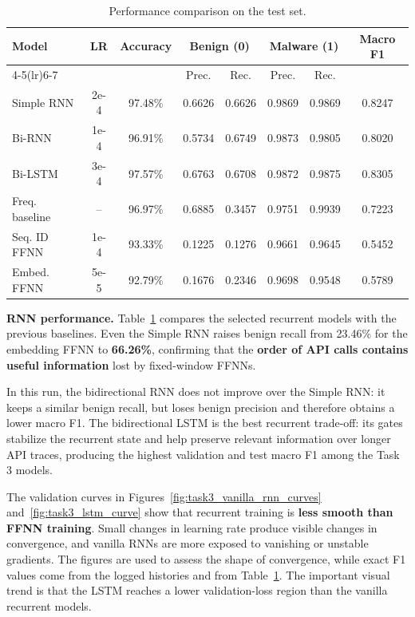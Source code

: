 \begin{table}[H]
\footnotesize
\centering
\setlength{\tabcolsep}{4pt}
\renewcommand{\arraystretch}{0.9}
\caption{Performance comparison on the test set.}
\label{tab:task3_performance}
\begin{tabular}{lccccccc}
\toprule
\textbf{Model} & \textbf{LR} & \textbf{Accuracy} & \multicolumn{2}{c}{\textbf{Benign (0)}} & \multicolumn{2}{c}{\textbf{Malware (1)}} & \textbf{Macro F1} \\
\cmidrule(lr){4-5}\cmidrule(lr){6-7}
 & & & Prec. & Rec. & Prec. & Rec. & \\
\midrule
Simple RNN & 2e-4 & 97.48\% & 0.6626 & 0.6626 & 0.9869 & 0.9869 & 0.8247 \\
Bi-RNN & 1e-4 & 96.91\% & 0.5734 & 0.6749 & 0.9873 & 0.9805 & 0.8020 \\
Bi-LSTM & 3e-4 & 97.57\% & 0.6763 & 0.6708 & 0.9872 & 0.9875 & 0.8305 \\
\midrule
Freq. baseline & -- & 96.97\% & 0.6885 & 0.3457 & 0.9751 & 0.9939 & 0.7223 \\
Seq. ID FFNN & 1e-4 & 93.33\% & 0.1225 & 0.1276 & 0.9661 & 0.9645 & 0.5452 \\
Embed. FFNN & 5e-5 & 92.79\% & 0.1676 & 0.2346 & 0.9698 & 0.9548 & 0.5789 \\
\bottomrule
\end{tabular}
\end{table}

\textbf{RNN performance.} Table~\ref{tab:task3_performance} compares the selected recurrent models with the previous baselines. Even the Simple RNN raises benign recall from 23.46\% for the embedding FFNN to \textbf{66.26\%}, confirming that the \textbf{order of API calls contains useful information} lost by fixed-window FFNNs.

In this run, the bidirectional RNN does not improve over the Simple RNN: it keeps a similar benign recall, but loses benign precision and therefore obtains a lower macro F1. The bidirectional LSTM is the best recurrent trade-off: its gates stabilize the recurrent state and help preserve relevant information over longer API traces, producing the highest validation and test macro F1 among the Task 3 models.

The validation curves in Figures~\ref{fig:task3_vanilla_rnn_curves} and~\ref{fig:task3_lstm_curve} show that recurrent training is \textbf{less smooth than FFNN training}. Small changes in learning rate produce visible changes in convergence, and vanilla RNNs are more exposed to vanishing or unstable gradients. The figures are used to assess the shape of convergence, while exact F1 values come from the logged histories and from Table~\ref{tab:task3_performance}. The important visual trend is that the LSTM reaches a lower validation-loss region than the vanilla recurrent models.


